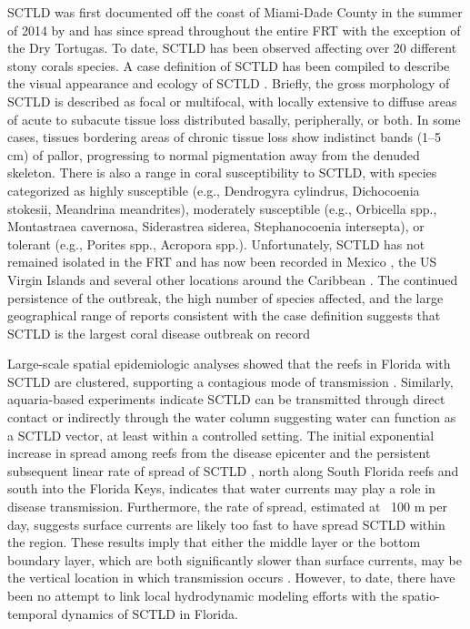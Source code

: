 \documentclass[utf8]{frontiersSCNS}
\begin{document}
SCTLD was first documented off the coast of Miami-Dade County in the summer of 2014 by \cite{precht2016unprecedented} and has since spread throughout the entire FRT with the exception of the Dry Tortugas. To date, SCTLD has been observed affecting over 20 different stony corals species. A case definition of SCTLD has been compiled to describe the visual appearance and ecology of SCTLD \citep{noaa2018}. Briefly, the gross morphology of SCTLD is described as focal or multifocal, with locally extensive to diffuse areas of acute to subacute tissue loss distributed basally, peripherally, or both. In some cases, tissues bordering areas of chronic tissue loss show indistinct bands (1–5 cm) of pallor, progressing to normal pigmentation away from the denuded skeleton. There is also a range in coral susceptibility to SCTLD, with species categorized as highly susceptible (e.g., Dendrogyra cylindrus, Dichocoenia stokesii, Meandrina meandrites), moderately susceptible (e.g., Orbicella spp., Montastraea cavernosa, Siderastrea siderea, Stephanocoenia intersepta), or tolerant (e.g., Porites spp., Acropora spp.). Unfortunately, SCTLD has not remained isolated in the FRT and has now been recorded in Mexico \citep{alvarez2019rapid}, the US Virgin Islands \citep{blondeau2020coral} and several other locations around the Caribbean \citep{kramer2019map}. The continued persistence of the outbreak, the high number of species affected, and the large geographical range of reports consistent with the case definition suggests that SCTLD is the largest coral disease outbreak on record 

Large-scale spatial epidemiologic analyses showed that the reefs in Florida with SCTLD are clustered, supporting a contagious mode of transmission \citep{muller2020spatial}. Similarly, aquaria-based experiments indicate SCTLD can be transmitted through direct contact or indirectly through the water column \citep{aeby2019pathogenesis} suggesting water can function as a SCTLD vector, at least within a controlled setting. The initial exponential increase in spread among reefs from the disease epicenter \citep{precht2016unprecedented} and the persistent subsequent linear rate of spread of SCTLD \citep{muller2020spatial}, north along South Florida reefs and south into the Florida Keys, indicates that water currents may play a role in disease transmission. Furthermore, the rate of spread, estimated at ~100 m per day, suggests surface currents are likely too fast to have spread SCTLD within the region. These results imply that either the middle layer or the bottom boundary layer, which are both significantly slower than surface currents, may be the vertical location in which transmission occurs \citep{muller2020spatial}. However, to date, there have been no attempt to link local hydrodynamic modeling efforts with the spatio-temporal dynamics of SCTLD in Florida.
\end{document}
